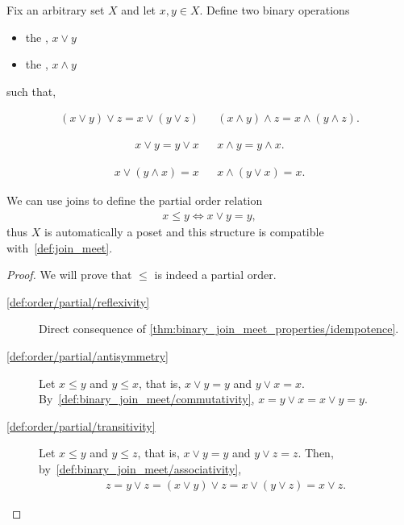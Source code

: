 \begin{definition}\label{def:binary_join_meet}
  Fix an arbitrary set \( X \) and let \( x, y \in X \). Define two binary operations
  \begin{itemize}
    \item the , \( x \lor y \)
    \item the , \( x \land y \)
  \end{itemize}
  such that,
  \begin{description}
    \begin{align*}
      (x \lor y) \lor z = x \lor (y \lor z)
      &&
      (x \land y) \land z = x \land (y \land z).
    \end{align*}

    \begin{align*}
      x \lor y = y \lor x
      &&
      x \land y = y \land x.
    \end{align*}

    \begin{align*}
      x \lor (y \land x) = x
      &&
      x \land (y \lor x) = x.
    \end{align*}
  \end{description}

  We can use joins to define the partial order relation
  \begin{align*}
    x \leq y \iff x \lor y = y,
  \end{align*}
  thus \( X \) is automatically a poset and this structure is compatible with~\cref{def:join_meet}.
\end{definition}
\begin{proof}
  We will prove that \( \leq \) is indeed a partial order.
  \begin{description}
    \item[\ref{def:order/partial/reflexivity}] Direct consequence of \cref{thm:binary_join_meet_properties/idempotence}.
    \item[\ref{def:order/partial/antisymmetry}] Let \( x \leq y \) and \( y \leq x \), that is, \( x \lor y = y \) and \( y \lor x = x \). By~\ref{def:binary_join_meet/commutativity}, \( x = y \lor x = x \lor y = y \).
    \item[\ref{def:order/partial/transitivity}] Let \( x \leq y \) and \( y \leq z \), that is, \( x \lor y = y \) and \( y \lor z = z \). Then, by~\ref{def:binary_join_meet/associativity},
    \begin{align*}
      z = y \lor z = (x \lor y) \lor z = x \lor (y \lor z) = x \lor z.
    \end{align*}
  \end{description}
\end{proof}

